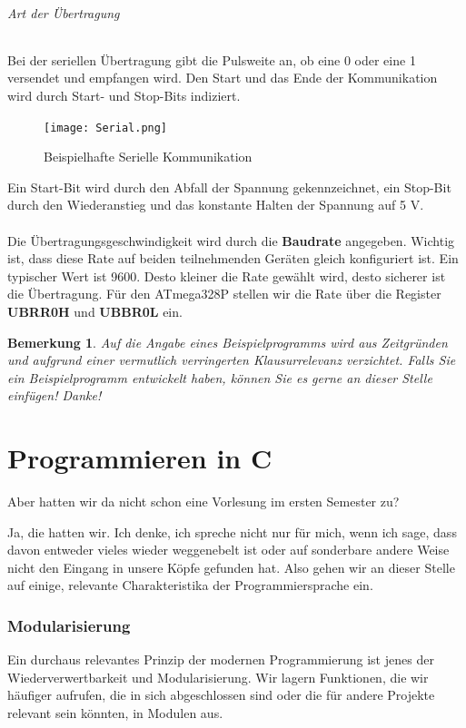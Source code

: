 \documentclass[11pt,a4paper]{scrartcl}
\newtheorem{note}{Bemerkung}
\begin{document}
\paragraph{Art der Übertragung}
Bei der seriellen Übertragung gibt die Pulsweite an, ob eine 0 oder eine 1 versendet und empfangen wird. Den Start und das Ende der Kommunikation wird durch Start- und Stop-Bits indiziert.
\begin{figure}[h!]
\centering
\texttt{[image: Serial.png]}
\caption{Beispielhafte Serielle Kommunikation}
\end{figure}
Ein Start-Bit wird durch den Abfall der Spannung gekennzeichnet, ein Stop-Bit durch den Wiederanstieg und das konstante Halten der Spannung auf 5 V. \\\\
Die Übertragungsgeschwindigkeit wird durch die \textbf{Baudrate} angegeben. Wichtig ist, dass diese Rate auf beiden teilnehmenden Geräten gleich konfiguriert ist. Ein typischer Wert ist 9600. Desto kleiner die Rate gewählt wird, desto sicherer ist die Übertragung. Für den ATmega328P stellen wir die Rate über die Register \textbf{UBRR0H} und \textbf{UBBR0L} ein.
\\
\begin{note}
Auf die Angabe eines Beispielprogramms wird aus Zeitgründen und aufgrund einer vermutlich verringerten Klausurrelevanz verzichtet. Falls Sie ein Beispielprogramm entwickelt haben, können Sie es gerne an dieser Stelle einfügen! Danke!
\end{note}
\pagebreak
\part{Programmieren in C}
\begin{flushright}
{\glqq}Aber hatten wir da nicht schon eine Vorlesung im ersten Semester zu?{\grqq}
\end{flushright}
Ja, die hatten wir. Ich denke, ich spreche nicht nur für mich, wenn ich sage, dass davon entweder vieles wieder weggenebelt ist oder auf sonderbare andere Weise nicht den Eingang in unsere Köpfe gefunden hat. Also gehen wir an dieser Stelle auf einige, relevante Charakteristika der Programmiersprache ein.
\section{Modularisierung}
Ein durchaus relevantes Prinzip der modernen Programmierung ist jenes der Wiederverwertbarkeit und Modularisierung. Wir lagern Funktionen, die wir häufiger aufrufen, die in sich abgeschlossen sind oder die für andere Projekte relevant sein könnten, in Modulen aus. 
\end{document}
